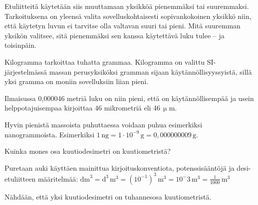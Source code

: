 Etuliitteitä käytetään siis muuttamaan yksikköä pienemmäksi tai suuremmaksi. Tarkoituksena on yleensä valita sovelluskohtaisesti sopivankokoinen yksikkö niin, että käytetyn luvun ei tarvitse olla valtavan suuri tai pieni. Mitä suuremman yksikön valitsee, sitä pienemmäksi sen kanssa käytettävä luku tulee -- ja toisinpäin.

\begin{esimerkki}
Kilogramma tarkoittaa tuhatta grammaa. Kilogramma on valittu SI-järjestelmässä massan perusyksiköksi gramman sijaan käytännöllisyyssyistä, sillä yksi gramma on moniin sovelluksiin liian pieni.
\end{esimerkki}

\begin{esimerkki}
Ilmaisussa 0,000046 metriä luku on niin pieni, että on käytännöllisempää ja usein helppotajuisempaa kirjoittaa 46 mikrometriä eli 46\,$\upmu$m.
\end{esimerkki}

\begin{esimerkki}
Hyvin pienistä massoista puhuttaessa voidaan puhua esimerkiksi nanogrammoista. Esimerkiksi $1\,\textrm{ng} = 1 \cdot 10^{-9}\,\textrm{g} = 0,000000009\,\textrm{g} $.
\end{esimerkki}



\begin{esimerkki}

Kuinka mones osa kuutiodesimetri on kuutiometristä?

	\begin{esimratk}
	Puretaan auki käyttäen mainittua kirjoituskonventiota, potenssisääntöjä ja desi-etuliitteen määritelmää: $\text{dm}^3=\text{d}^3\,\text{m}^3=(10^{-1})^3\,\text{m}^3=10^-3\,\text{m}^3=\frac{1}{1000}\,\text{m}^3$
	
	Nähdään, että yksi kuutiodesimetri on tuhannesosa kuutiometristä.
	\end{esimratk}

\end{esimerkki}

